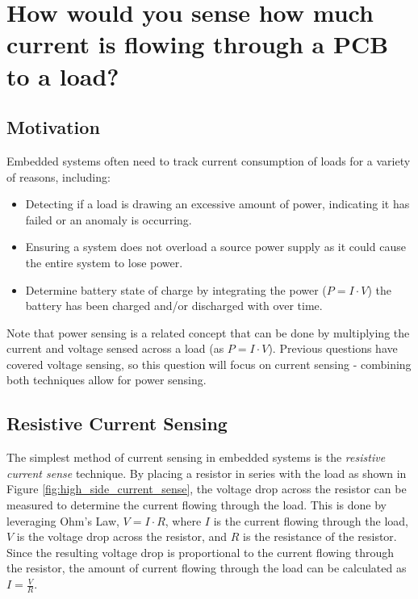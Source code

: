 \documentclass[main.tex]{subfiles}
\begin{document}
\section{How would you sense how much current is flowing through a PCB to a load?}


\spoilerline

\subsection{Motivation}
Embedded systems often need to track current consumption of loads for a variety of reasons, including:
\begin{itemize}
    \item Detecting if a load is drawing an excessive amount of power, indicating it has failed or an anomaly is occurring. 
    \item Ensuring a system does not overload a source power supply as it could cause the entire system to lose power. 
    \item Determine battery state of charge by integrating the power ($P = I \cdot V$) the battery has been charged and/or discharged with over time.
\end{itemize}

\noindent Note that power sensing is a related concept that can be done by multiplying the current and voltage sensed across a load (as $P = I \cdot V$). Previous questions have covered voltage sensing, so this question will focus on current sensing - combining both techniques allow for power sensing.

\subsection{Resistive Current Sensing}
The simplest method of current sensing in embedded systems is the \textit{resistive current sense} technique. By placing a resistor in series with the load as shown in Figure \ref{fig:high_side_current_sense}, the voltage drop across the resistor can be measured to determine the current flowing through the load. This is done by leveraging Ohm's Law, $V = I \cdot R$, where $I$ is the current flowing through the load, $V$ is the voltage drop across the resistor, and $R$ is the resistance of the resistor. Since the resulting voltage drop is proportional to the current flowing through the resistor, the amount of current flowing through the load can be calculated as $I = \frac{V}{R}$.
\end{document}
